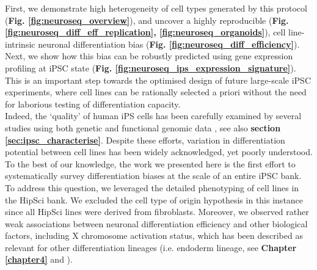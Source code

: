 First, we demonstrate high heterogeneity of cell types generated by this protocol (\textbf{Fig. \ref{fig:neuroseq_overview}}), and uncover a highly reproducible (\textbf{Fig. \ref{fig:neuroseq_diff_eff_replication}, \ref{fig:neuroseq_organoids}}), cell line-intrinsic neuronal differentiation bias (\textbf{Fig. \ref{fig:neuroseq_diff_efficiency}}).
Next, we show how this bias can be robustly predicted using gene expression profiling at iPSC state (\textbf{Fig. \ref{fig:neuroseq_ips_expression_signature}}). 
This is an important step towards the optimised design of future large-scale iPSC experiments, where cell lines can be rationally selected a priori without the need for laborious testing of differentiation capacity. \\

Indeed, the `quality' of human iPS cells has been carefully examined by several studies using both genetic and functional genomic data \cite{muller2011bioinformatic, international2018assessment, tsankov2015qpcr, bock2011reference}, see also \textbf{section
\ref{sec:ipsc_characterise}}. 
Despite these efforts, variation in differentiation potential between cell lines has been widely acknowledged, yet poorly understood. 
To the best of our knowledge, the work we presented here is the first effort to systematically survey differentiation biases at the scale of an entire iPSC bank. 
To address this question, we leveraged the detailed phenotyping of cell lines in the HipSci bank.
We excluded the cell type of origin hypothesis \cite{hu2016effects} in this instance since all HipSci lines were derived from fibroblasts.
Moreover, we observed rather weak associations between neuronal differentiation efficiency and other biological factors, including X chromosome activation status, which has been described as relevant for other differentiation lineages (i.e. endoderm lineage, see \textbf{Chapter
\ref{chapter4}}
and \cite{cuomo2020single}).
\\

